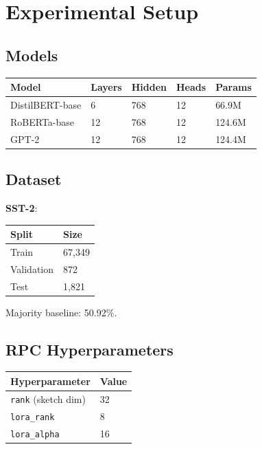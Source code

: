 
\section{Experimental Setup}

\subsection{Models}

\begin{table}[H]
\centering
\small
\begin{tabular}{lllll}
\toprule
\textbf{Model} & \textbf{Layers} & \textbf{Hidden} & \textbf{Heads} & \textbf{Params} \\
\midrule
DistilBERT-base & 6 & 768 & 12 & 66.9M \\
RoBERTa-base & 12 & 768 & 12 & 124.6M \\
GPT-2 & 12 & 768 & 12 & 124.4M \\
\bottomrule
\end{tabular}
\end{table}

\subsection{Dataset}

\textbf{SST-2}:

\begin{table}[H]
\centering
\small
\begin{tabular}{ll}
\toprule
\textbf{Split} & \textbf{Size} \\
\midrule
Train & 67,349 \\
Validation & 872 \\
Test & 1,821 \\
\bottomrule
\end{tabular}
\end{table}

Majority baseline: 50.92\%.

\subsection{RPC Hyperparameters}

\begin{table}[H]
\centering
\small
\begin{tabular}{ll}
\toprule
\textbf{Hyperparameter} & \textbf{Value} \\
\midrule
\texttt{rank} (sketch dim) & 32 \\
\texttt{lora\_rank} & 8 \\
\texttt{lora\_alpha} & 16 \\
\bottomrule
\end{tabular}
\end{table}

